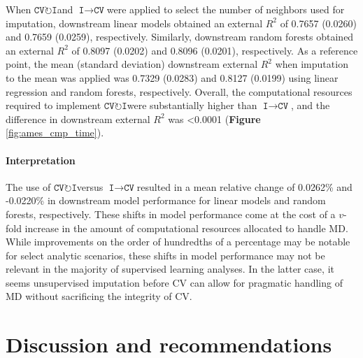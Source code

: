 \documentclass[AMA,STIX1COL,doublespace]{WileyNJD-v2}
\begin{document}
When $\texttt{CV}\!\circlearrowright\!\texttt{I}$\space and
$\texttt{I}\!\!\rightarrow\!\texttt{CV}$\space were applied to select
the number of neighbors used for imputation, downstream linear models
obtained an external \(R^2\) of 0.7657 (0.0260) and 0.7659 (0.0259),
respectively. Similarly, downstream random forests obtained an external
\(R^2\) of 0.8097 (0.0202) and 0.8096 (0.0201), respectively. As a
reference point, the mean (standard deviation) downstream external
\(R^2\) when imputation to the mean was applied was 0.7329 (0.0283) and
0.8127 (0.0199) using linear regression and random forests,
respectively. Overall, the computational resources required to implement
$\texttt{CV}\!\circlearrowright\!\texttt{I}$\space were substantially
higher than $\texttt{I}\!\!\rightarrow\!\texttt{CV}$\space, and the
difference in downstream external \(R^2\) was \textless0.0001
(\textbf{Figure} \ref{fig:ames_cmp_time}).

\paragraph{Interpretation}

The use of $\texttt{CV}\!\circlearrowright\!\texttt{I}$\space versus
$\texttt{I}\!\!\rightarrow\!\texttt{CV}$\space resulted in a mean
relative change of 0.0262\% and -0.0220\% in downstream model
performance for linear models and random forests, respectively. These
shifts in model performance come at the cost of a \(v\)-fold increase in
the amount of computational resources allocated to handle MD. While
improvements on the order of hundredths of a percentage may be notable
for select analytic scenarios, these shifts in model performance may not
be relevant in the majority of supervised learning analyses. In the
latter case, it seems unsupervised imputation before CV can allow for
pragmatic handling of MD without sacrificing the integrity of CV.

\section{Discussion and recommendations} \label{sec:discuss}
\end{document}
